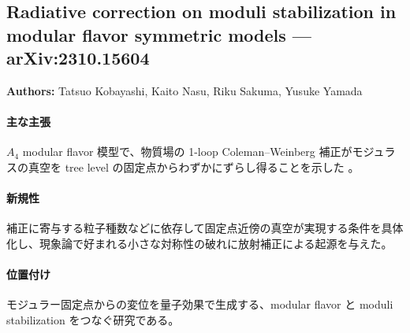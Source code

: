 \subsection{Radiative correction on moduli stabilization in modular flavor symmetric models --- arXiv:2310.15604}

\textbf{Authors:} Tatsuo Kobayashi, Kaito Nasu, Riku Sakuma, Yusuke Yamada

\paragraph{主な主張}
$A_4$ modular flavor 模型で、物質場の 1-loop Coleman--Weinberg 補正がモジュラスの真空を tree level の固定点からわずかにずらし得ることを示した \cite{Kobayashi:2023spx}。

\paragraph{新規性}
補正に寄与する粒子種数などに依存して固定点近傍の真空が実現する条件を具体化し、現象論で好まれる小さな対称性の破れに放射補正による起源を与えた。

\paragraph{位置付け}
モジュラー固定点からの変位を量子効果で生成する、modular flavor と moduli stabilization をつなぐ研究である。

